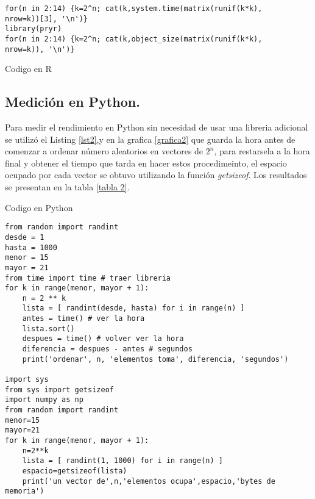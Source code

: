 \documentclass{article}
\begin{document}
\lstset{language=Python}
\lstset{frame=lines}
\lstset{basicstyle=\footnotesize}
\begin{listing}
\begin{verbatim}
for(n in 2:14) {k=2^n; cat(k,system.time(matrix(runif(k*k),
nrow=k))[3], '\n')}
library(pryr)
for(n in 2:14) {k=2^n; cat(k,object_size(matrix(runif(k*k),
nrow=k)), '\n')}
\end{verbatim}
\caption{Codigo en R}
\label{listing:2}
\end{listing}


\subsection{Medición en Python.} 
Para medir el rendimiento en Python sin necesidad de usar una libreria adicional se utilizó el Listing \ref{lst2},y en la grafica \ref{grafica2} que guarda la hora antes de comenzar a ordenar número aleatorios en vectores de $2^n$, para restarsela a la hora final y obtener el tiempo que tarda en hacer estos procedimeinto, el espacio ocupado por cada vector se obtuvo utilizando la función \emph{getsizeof}. Los resultados se presentan en la tabla \ref{tabla 2}.
\begin{listing}
\caption{Codigo en Python}
\label{listing:1}
\begin{verbatim}
from random import randint
desde = 1
hasta = 1000
menor = 15
mayor = 21
from time import time # traer libreria
for k in range(menor, mayor + 1):
    n = 2 ** k
    lista = [ randint(desde, hasta) for i in range(n) ]
    antes = time() # ver la hora
    lista.sort()
    despues = time() # volver ver la hora
    diferencia = despues - antes # segundos
    print('ordenar', n, 'elementos toma', diferencia, 'segundos')
    
import sys
from sys import getsizeof
import numpy as np
from random import randint
menor=15
mayor=21
for k in range(menor, mayor + 1):
    n=2**k
    lista = [ randint(1, 1000) for i in range(n) ]
    espacio=getsizeof(lista)
    print('un vector de',n,'elementos ocupa',espacio,'bytes de memoria')
\end{verbatim}
\end{listing}
\end{document}
